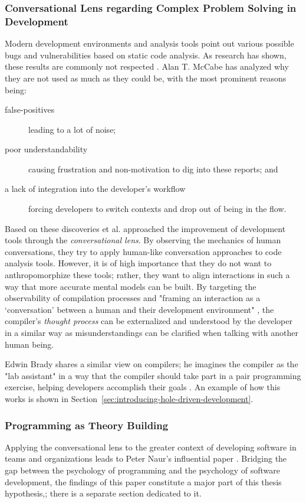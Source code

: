\subsubsection{Conversational Lens regarding Complex Problem Solving in Development}
\label{sec:conversational-lens}
Modern development environments and analysis tools point out various possible bugs and vulnerabilities based on static code analysis.
As research has shown, these results are commonly not respected \cite{mccabe_towards_2023}.
Alan T. McCabe has analyzed why they are not used as much as they could be, with the most prominent reasons being:
%
\begin{description}
\item[false-positives] leading to a lot of noise;
\item[poor understandability] causing frustration and non-motivation to dig into these reports; and
\item[a lack of integration into the developer's workflow] forcing developers to switch contexts and drop out of being in the flow.
\end{description}
%
Based on these discoveries \citeauthor{mccabe_towards_2023} et al. approached the improvement of development tools through the \emph{conversational lens}.
By observing the mechanics of human conversations, they try to apply human-like conversation approaches to code analysis tools.
However, it is of high importance that they do not want to anthropomorphize these tools; rather, they want to align interactions in such a way that more accurate mental models can be built.
By targeting the observability of compilation processes and "framing an interaction as a `conversation' between a human and their development environment" \cite{mccabe_towards_2023}, the compiler's \emph{thought process} can be externalized and understood by the developer in a similar way as misunderstandings can be clarified when talking with another human being.

Edwin Brady shares a similar view on compilers; he imagines the compiler as the "lab assistant" in a way that the compiler should take part in a pair programming exercise, helping developers accomplish their goals \cite{brady_type-driven_2017}.
An example of how this works is shown in Section~\ref{sec:introducing-hole-driven-development}.


\subsubsection{Programming as Theory Building}
\label{sec:programming-as-theory-building}
Applying the conversational lens to the greater context of developing software in teams and organizations leads to Peter Naur's influential paper  \cite{naur_programming_1985}.
Bridging the gap between the psychology of programming and the psychology of software development, the findings of this paper constitute a major part of this thesis hypothesis,; there is a separate section dedicated to it.

